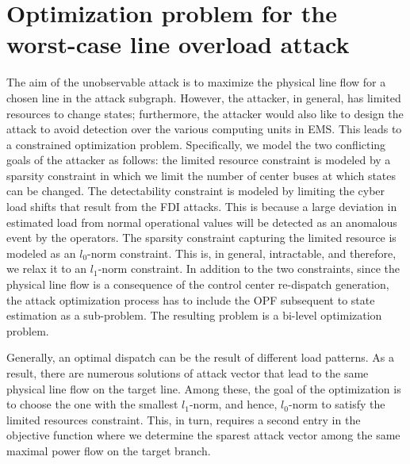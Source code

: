 \documentclass[twocolumn,english,final,journal]{IEEEtran}
\theoremstyle{plain}
\theoremstyle{definition}
\begin{document}
\section{Optimization problem for the worst-case line overload attack\label{sec:optimization-problem}}

The aim of the unobservable attack is to maximize the physical line
flow for a chosen line in the attack subgraph. However, the attacker,
in general, has limited resources to change states; furthermore, the
attacker would also like to design the attack to avoid detection over
the various computing units in EMS. This leads to a constrained optimization
problem. Specifically, we model the two conflicting goals of the attacker
as follows: the limited resource constraint is modeled by a sparsity
constraint in which we limit the number of center buses at which states
can be changed. The detectability constraint is modeled by limiting
the cyber load shifts that result from the FDI attacks. This is because
a large deviation in estimated load from normal operational values
will be detected as an anomalous event by the operators. The sparsity
constraint capturing the limited resource is modeled as an $l_{0}$-norm
constraint. This is, in general, intractable, and therefore, we relax
it to an $l_{1}$-norm constraint. In addition to the two constraints,
since the physical line flow is a consequence of the control center
re-dispatch generation, the attack optimization process has to include
the OPF subsequent to state estimation as a sub-problem. The resulting
problem is a bi-level optimization problem.

Generally, an optimal dispatch can be the result of different load
patterns. As a result, there are numerous solutions of attack vector
that lead to the same physical line flow on the target line. Among
these, the goal of the optimization is to choose the one with the
smallest $l_{1}$-norm, and hence, $l_{0}$-norm to satisfy the limited
resources constraint. This, in turn, requires a second entry in the
objective function where we determine the sparest attack vector among
the same maximal power flow on the target branch.
\end{document}
